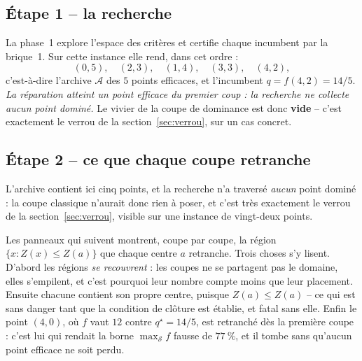 \documentclass[11pt,a4paper]{article}
\theoremstyle{plain}
\theoremstyle{remark}
\newcommand{\Scal}{\mathcal{S}}
\newcommand{\Acal}{\mathcal{A}}
\begin{document}
\subsection{Étape 1 -- la recherche}

La phase~1 explore l'espace des critères et certifie chaque incumbent par la
brique~1. Sur cette instance elle rend, dans cet ordre :
\[
  (0,5),\quad (2,3),\quad (1,4),\quad (3,3),\quad (4,2),
\]
c'est-à-dire l'archive $\Acal$ des $5$ points efficaces, et l'incumbent
$q=f(4,2)=14/5$. \emph{La réparation atteint un point efficace du premier
coup : la recherche ne collecte aucun point dominé.} Le vivier de la coupe de
dominance est donc \textbf{vide} -- c'est exactement le verrou de
la section~\ref{sec:verrou}, sur un cas concret.

\subsection{Étape 2 -- ce que chaque coupe retranche}

L'archive contient ici cinq points, et la recherche n'a traversé
\emph{aucun} point dominé : la coupe classique n'aurait donc rien à poser,
et c'est très exactement le verrou de la section~\ref{sec:verrou}, visible
sur une instance de vingt-deux points.

Les panneaux qui suivent montrent, coupe par coupe, la région
$\{x:Z(x)\le Z(a)\}$ que chaque centre $a$ retranche. Trois choses s'y
lisent. D'abord les régions \emph{se recouvrent} : les coupes ne se
partagent pas le domaine, elles s'empilent, et c'est pourquoi leur nombre
compte moins que leur placement. Ensuite chacune contient son propre centre,
puisque $Z(a)\le Z(a)$ -- ce qui est sans danger tant que la condition de
clôture est établie, et fatal sans elle. Enfin le point $(4,0)$, où $f$ vaut
$12$ contre $q^{\star}=14/5$, est retranché dès la première coupe : c'est
lui qui rendait la borne $\max_{\Scal}f$ fausse de $77\ \%$, et il tombe
sans qu'aucun point efficace ne soit perdu.
\end{document}
